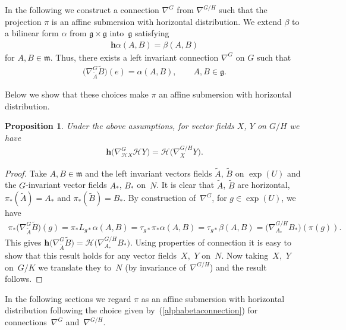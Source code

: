 \documentclass[pdftex]{sigma}
\numberwithin{equation}{section}
\newtheorem{Proposition}[Theorem]{Proposition}
{ \theoremstyle{definition}
\newtheorem{Definition}[Theorem]{Definition}
\newtheorem{Example}[Theorem]{Example}
\newtheorem{Remark}[Theorem]{Remark}}
\newcommand{\g}{\mathfrak{g}}
\newcommand{\m}{\mathfrak{m}}
\begin{document}
In the following we construct a connection $\nabla^{G}$ from $\nabla^{G/H}$ such that the projection $\pi$ is an af\/f\/ine submersion with horizontal distribution. We extend $\beta$ to a bilinear form $\alpha$ from $\g \times \g$ into~$\g$ satisfying
\begin{gather}\label{alphabetaconnection}
  \mathbf{h}\alpha(A,B) = \beta(A,B)
\end{gather}
for $A,B \in \m$. Thus, there exists a left invariant connection $\nabla^{G}$ on $G$ such that
\begin{gather*}
  \big(\nabla^{G}_{\tilde{A}}\tilde{B}\big)(e) = \alpha(A,B), \qquad A,B \in \g.
\end{gather*}

Below we show that these choices make $\pi$ an af\/f\/ine submersion with horizontal distribution.

\begin{Proposition}\label{propconn1}
  Under the above assumptions, for vector fields $X$, $Y$ on $G/H$ we have
  \begin{gather*}
    \mathbf{h}\big(\nabla^{G}_{\mathcal{H}X}\mathcal{H}Y\big) = \mathcal{H}\big(\nabla^{G/H}_{X}Y\big).
  \end{gather*}
\end{Proposition}

\begin{proof}
  Take $A, B \in \m$ and the left invariant vectors f\/ields $\tilde{A}$, $\tilde{B}$ on $\exp(U)$ and the $G$-invariant vector f\/ields $A_{*}$, $B_{*}$ on~$N$. It is clear that $\tilde{A}$, $\tilde{B}$ are horizontal, $\pi_{*}(\tilde{A})= A_{*}$ and $\pi_{*}(\tilde{B}) = B_{*}$. By construction of~$\nabla^{G}$, for $g \in \exp(U)$, we have
  \begin{gather*}
    \pi_{*}\big(\nabla^{G}_{\tilde{A}}\tilde{B}\big)(g) = \pi_{*}L_{g*} \alpha(A,B) = \tau_{g*}\pi_{*}\alpha(A,B)
    = \tau_{g*}\beta(A,B) = \big(\nabla^{G/H}_{A_{*}}B_{*}\big)(\pi(g)).
  \end{gather*}
  This gives $\mathbf{h}\big(\nabla^{G}_{\tilde{A}}\tilde{B}\big) = \mathcal{H}\big(\nabla^{G/H}_{A_{*}}B_{*}\big)$. Using properties
  of connection it is easy to show that this result holds for any vector f\/ields~$X$,~$Y$ on~$N$.
  Now taking~$X$,~$Y$ on~$G/K$ we translate they to~$N$ (by invariance of~$\nabla^{G/H}$) and the result follows.
\end{proof}

In the following sections we regard $\pi$ as an af\/f\/ine submersion with horizontal distribution following the choice given by~(\ref{alphabetaconnection}) for connections~$\nabla^{G}$ and~$\nabla^{G/H}$.
\end{document}

